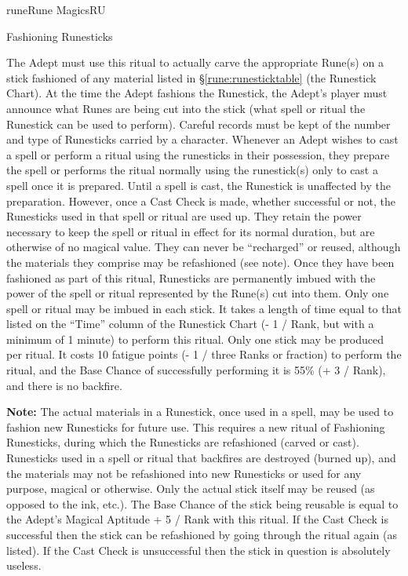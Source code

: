 \begin{college}[1.1]{rune}{Rune Magics}{RU}
\begin{ritual}[Q-1]{Fashioning Runesticks}

\begin{effects}
The Adept must use this ritual to actually carve the appropriate
Rune(s) on a stick fashioned of any material listed in
\S\ref{rune:runesticktable} (the Runestick Chart).  At the time the
Adept fashions the Runestick, the Adept's player must announce what
Runes are being cut into the stick (\ie what spell or ritual the
Runestick can be used to perform). Careful records must be kept of the
number and type of Runesticks carried by a character.  Whenever an
Adept wishes to cast a spell or perform a ritual using the runesticks
in their possession, they prepare the spell or performs the ritual
normally using the runestick(s) only to cast a spell once it is
prepared. Until a spell is cast, the Runestick is unaffected by the
preparation.  However, once a Cast Check is made, whether successful
or not, the Runesticks used in that spell or ritual are used up. They
retain the power necessary to keep the spell or ritual in effect for
its normal duration, but are otherwise of no magical value.  They can
never be ``recharged'' or reused, although the materials they comprise
may be refashioned (see note).  Once they have been fashioned as part
of this ritual, Runesticks are permanently imbued with the power of
the spell or ritual represented by the Rune(s) cut into them.  Only
one spell or ritual may be imbued in each stick.  It takes a length of
time equal to that listed on the ``Time'' column of the Runestick
Chart (- 1 / Rank, but with a minimum of 1 minute) to perform this
ritual.  Only one stick may be produced per ritual.  It costs 10
fatigue points (- 1 / three Ranks or fraction) to perform the ritual,
and the Base Chance of successfully performing it is 55\% (+ 3 /
Rank), and there is no backfire.

\textbf{Note:} The actual materials in a Runestick, once used in a
spell, may be used to fashion new Runesticks for future use.  This
requires a new ritual of Fashioning Runesticks, during which the
Runesticks are refashioned (carved or cast). Runesticks used in a
spell or ritual that backfires are destroyed (burned up), and the
materials may not be refashioned into new Runesticks or used for any
purpose, magical or otherwise. Only the actual stick itself may be
reused (as opposed to the ink, etc.). The Base Chance of the stick
being reusable is equal to the Adept's Magical Aptitude + 5 / Rank
with this ritual. If the Cast Check is successful then the stick can
be refashioned by going through the ritual again (as listed). If the
Cast Check is unsuccessful then the stick in question is absolutely
useless.


\end{effects}
\end{ritual}
\end{college}
